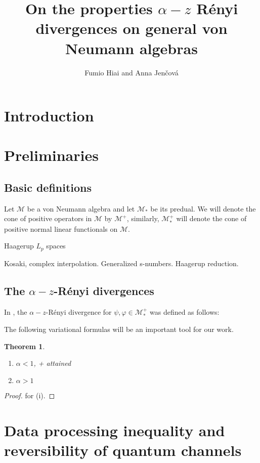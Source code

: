 \documentclass[12pt]{article}
\title{On the properties $\alpha-z$ R\'enyi divergences on general von Neumann algebras}
\author{Fumio Hiai and Anna Jen\v cov\'a}
\newtheorem{theorem}{Theorem}
\theoremstyle{definition}
\theoremstyle{remark}
\begin{document}
\maketitle


\section{Introduction}

\section{Preliminaries}

\subsection{Basic definitions}

Let $\mathcal M$ be a von Neumann algebra and let $\mathcal M_*$ be its predual. We will
denote the cone of positive operators in $\mathcal M$ by $\mathcal M^+$, similarly,
$\mathcal M_*^+$ will denote the cone of positive normal linear functionals on $\mathcal
M$.  

Haagerup $L_p$ spaces

Kosaki, complex interpolation. Generalized s-numbers. Haagerup reduction.


\subsection{The $\alpha-z$-R\'enyi divergences}

In \cite{kato2023onrenyi}, the
$\alpha-z$-R\'enyi divergence for $\psi,\varphi\in \mathcal M_*^+$  was defined as
follows: 




The following variational formulas will be an important tool for our work.

\begin{theorem}\label{thm:variational}
\begin{enumerate}
\item[(i)] $\alpha<1$, + attained
\item[(ii)] $\alpha>1$

\end{enumerate}


\end{theorem}


\begin{proof} \cite{kato2023onrenyi} for (i).


\end{proof}

\section{Data processing inequality and reversibility of quantum channels}
\end{document}
